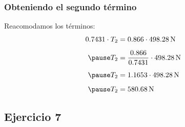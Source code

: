 \documentclass[12pt]{beamer}
\begin{document}
\begin{frame}
\frametitle{Obteniendo el segundo término}
Reacomodamos los términos:
\pause
\begin{eqnarray*}
\begin{aligned}
0.7431 \cdot T_{2} &= 0.866 \cdot \SI{498.28}{\newton} \\[0.5em] \pause
T_{2} &= \dfrac{0.866}{0.7431} \cdot \SI{498.28}{\newton} \\[0.5em] \pause
T_{2} &= 1.1653 \cdot \SI{498.28}{\newton} \\[0.5em] \pause
T_{2} &= \SI{580.68}{\newton}
\end{aligned}
\end{eqnarray*}
\end{frame}

\subsection*{Ejercicio 7}
\end{document}
